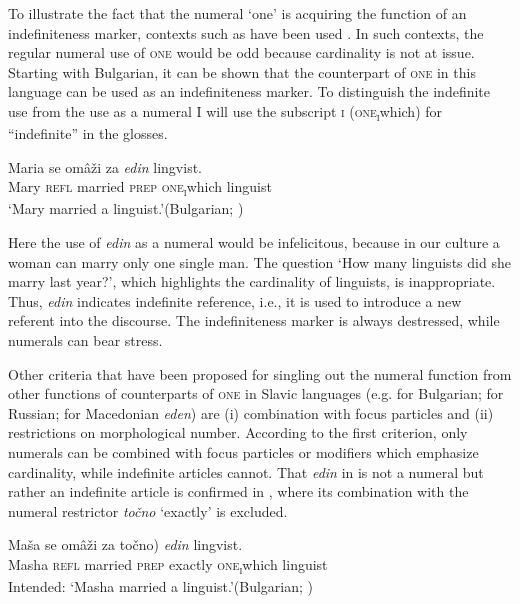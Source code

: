 \documentclass[output=paper,colorlinks,citecolor=brown]{langscibook}
\begin{document}
To illustrate the fact that the numeral `one' is acquiring the function of an indefiniteness marker, contexts such as  have been used \citep{Ionin2013}. In such contexts, the regular numeral use of \textsc{one} would be odd because cardinality is not at issue. Starting with Bulgarian, it can be shown that the counterpart of \textsc{one} in this language can be used as an indefiniteness marker. To distinguish the indefinite use from the use as a numeral I will use the subscript \textsc{i} (\textsc{one\textsubscript{i}}which) for “indefinite” in the glosses.

\ea\label{geist:ex:bulg-edin1}
\gll Maria se omâži za \textit{edin} lingvist.\\
Mary \textsc{refl} married \textsc{prep} \textsc{one\textsubscript{i}}which linguist\\
\glt ‘Mary married a linguist.’\hfill (Bulgarian; \citealt[125]{Geist2013})
\z

\noindent Here the use of \textit{edin} as a numeral would be infelicitous, because in our culture a woman can marry only one single man. The question `How many linguists did she marry last year?', which highlights the cardinality of linguists, is inappropriate. Thus, \textit{edin} indicates indefinite reference, i.e., it is used to introduce a new referent into the discourse. The indefiniteness marker is always destressed, while numerals can bear stress.

Other criteria that have been proposed for singling out the numeral function from other functions of counterparts of \textsc{one} in Slavic languages (e.g. \citealt{Geist2013} for Bulgarian; \citealt{Smelev2002} for Russian; \citealt{Weiss2004} for Macedonian \textit{eden}) are (i) combination with focus particles and (ii) restrictions on morphological number. According to the first criterion, only numerals can be combined with focus particles or modifiers which emphasize cardinality, while indefinite articles cannot. That \textit{edin} in  is not a numeral but rather an indefinite article is confirmed in , where its combination with the numeral restrictor \textit{točno} ‘exactly’ is excluded. 

\ea\label{geist:ex:bulg-edin2}
\gll Maša se omâži za \minsp{(*} točno) \textit{edin} lingvist.\\
Masha \textsc{refl} married \textsc{prep} {} exactly \textsc{one\textsubscript{i}}which linguist\\
\glt Intended: ‘Masha married a linguist.’\hfill (Bulgarian; \citealt[125]{Geist2013})
\z
\end{document}
